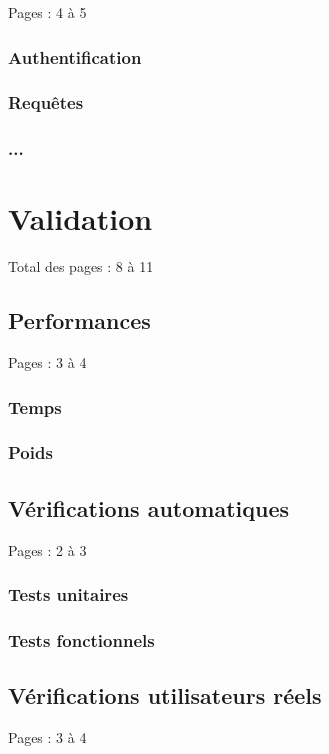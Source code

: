 \documentclass{eplmastersthesis_FR}
\begin{document}
			Pages : 4 à 5
			\subsection*{Authentification}
			\subsection*{Requêtes}
			\subsection*{...}

	\chapter{Validation}

		Total des pages : 8 à 11

		\section{Performances}

			Pages : 3 à 4

			\subsection*{Temps}
			\subsection*{Poids}

		\section{Vérifications automatiques}

			Pages : 2 à 3

			\subsection*{Tests unitaires}
			\subsection*{Tests fonctionnels}

		\section{Vérifications utilisateurs réels}

			Pages : 3 à 4
\end{document}
